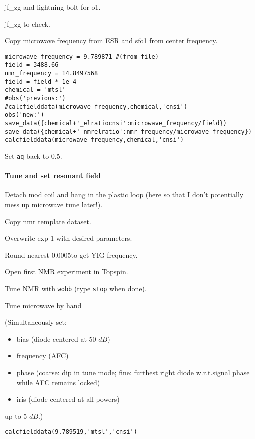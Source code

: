 \begin{scriptsize}
\begin{python}[off]
jf\_zg and lightning bolt for o1.  

jf\_zg to check.

Copy microwave frequency from ESR and sfo1 from center frequency.  


\begin{lstlisting}
microwave_frequency = 9.789871 #(from file)
field = 3488.66
nmr_frequency = 14.8497568
field = field * 1e-4
chemical = 'mtsl'
#obs('previous:')
#calcfielddata(microwave_frequency,chemical,'cnsi')
obs('new:')
save_data({chemical+'_elratiocnsi':microwave_frequency/field})
save_data({chemical+'_nmrelratio':nmr_frequency/microwave_frequency})
calcfielddata(microwave_frequency,chemical,'cnsi')
\end{lstlisting}


Set \texttt{aq} back to 0.5.

\paragraph{Tune and set resonant field}
Detach mod coil and hang in the plastic loop (here so that I don't potentially mess up microwave tune later!).

Copy nmr template dataset.

Overwrite exp 1 with desired parameters.

Round nearest 0.0005\GHz to get YIG frequency.

Open first NMR experiment in Topspin.

Tune NMR with {\tt wobb} (type {\tt stop} when done).


Tune microwave by hand
{\small (Simultaneously set:
\begin{itemize}
    \item bias (diode centered at 50 $dB$)
    \item frequency (AFC)
    \item phase (coarse: dip in tune mode; fine: furthest right diode w.r.t.signal phase while AFC remains locked)
    \item iris (diode centered at all powers) 
\end{itemize}
up to 5 $dB$.)}
\begin{lstlisting}
calcfielddata(9.789519,'mtsl','cnsi')
\end{lstlisting}


\end{python}
\end{scriptsize}
